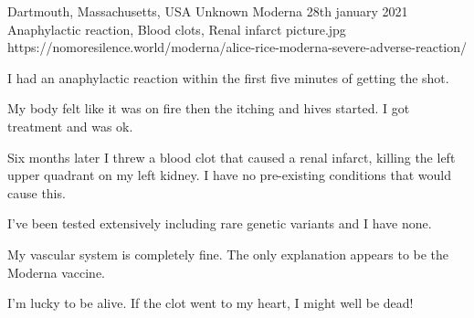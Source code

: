           {Dartmouth, Massachusetts, USA}
          {Unknown}
          {Moderna}
          {28th january 2021}
          {Anaphylactic reaction, Blood clots, Renal infarct
          }
          {picture.jpg}
          {https://nomoresilence.world/moderna/alice-rice-moderna-severe-adverse-reaction/}
          {
            
I had an anaphylactic reaction within the first five minutes of getting the
shot.

My body felt like it was on fire then the itching and hives started. I got
treatment and was ok.

Six months later I threw a blood clot that caused a renal infarct, killing the
left upper quadrant on my left kidney. I have no pre-existing conditions that
would cause this.

I’ve been tested extensively including rare genetic variants and I have none.

My vascular system is completely fine. The only explanation appears to be the
Moderna vaccine.

I’m lucky to be alive. If the clot went to my heart, I might well be dead!

}
